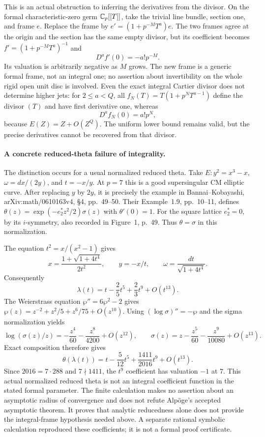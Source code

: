 \documentclass[11pt]{article}
\theoremstyle{definition}\newtheorem{definition}[theorem]{Definition}\newtheorem{remark}[theorem]{Remark}
\begin{document}
This is an actual obstruction to inferring the derivatives from
the divisor. On the formal characteristic-zero germ
$\mathbb C_p[[T]]$, take the trivial line bundle, section one, and frame
$e$. Replace the frame by
$e'=(1+p^{-M}T^a)e$. The two frames agree at the origin and the
section has the same empty divisor, but its coefficient becomes
$f'=(1+p^{-M}T^a)^{-1}$ and
\[
 D^af'(0)=-a!p^{-M}.
\]
Its valuation is arbitrarily negative as $M$ grows. The new frame
is a generic formal frame, not an integral one; no assertion about
invertibility on the whole rigid open unit disc is involved.
Even the exact integral Cartier divisor does not determine higher
jets: for $2\leq a<Q$, all
$f_N(T)=T(1+p^NT^{a-1})$ define the divisor $(T)$ and have first
derivative one, whereas
\[
 D^af_N(0)=a!p^N,
\]
because $E(Z)=Z+O(Z^Q)$. The uniform lower bound remains valid,
but the precise derivatives cannot be recovered from that divisor.

\paragraph{A concrete reduced-theta failure of integrality.}
The distinction occurs for a usual normalized reduced theta.
Take $E:y^2=x^3-x$, $\omega=dx/(2y)$, and $t=-x/y$.
At $p=7$ this is a good supersingular CM elliptic curve.
After replacing $y$ by $2y$, it is precisely the example in
Bannai--Kobayashi, arXiv:math/0610163v4, \S4, pp.~49--50.
Their Example~1.9, pp.~10--11, defines
$\theta(z)=\exp(-e_2^*z^2/2)\sigma(z)$ with $\theta'(0)=1$.
For the square lattice $e_2^*=0$, by its $i$-symmetry, also recorded
in Figure~1, p.~49. Thus $\theta=\sigma$ in this normalization.

The equation $t^2=x/(x^2-1)$ gives
\[
 x=\frac{1+\sqrt{1+4t^4}}{2t^2},\qquad y=-x/t,
 \qquad \omega=\frac{dt}{\sqrt{1+4t^4}}.
\]
Consequently
\[
 \lambda(t)=t-\frac25t^5+\frac23t^9+O(t^{13}).
\]
The Weierstrass equation $\wp''=6\wp^2-2$ gives
$\wp(z)=z^{-2}+z^2/5+z^6/75+O(z^{10})$.
Using $(\log\sigma)''=-\wp$ and the sigma normalization yields
\[
 \log(\sigma(z)/z)=-\frac{z^4}{60}-\frac{z^8}{4200}+O(z^{12}),
 \qquad
 \sigma(z)=z-\frac{z^5}{60}-\frac{z^9}{10080}+O(z^{13}).
\]
Exact composition therefore gives
\[
 \theta(\lambda(t))
 =t-\frac5{12}t^5+\frac{1411}{2016}t^9+O(t^{13}).
\]
Since $2016=7\cdot288$ and $7\nmid1411$, the $t^9$ coefficient
has valuation $-1$ at $7$. This actual normalized reduced theta is
not an integral coefficient function in the stated formal
parameter. The finite calculation makes no assertion about an
asymptotic radius of convergence and does not refute Alp\"oge's
accepted asymptotic theorem. It proves that analytic reducedness
alone does not provide the integral-frame hypothesis needed above.
A separate rational symbolic calculation reproduced these
coefficients; it is not a formal proof certificate.
\end{document}

